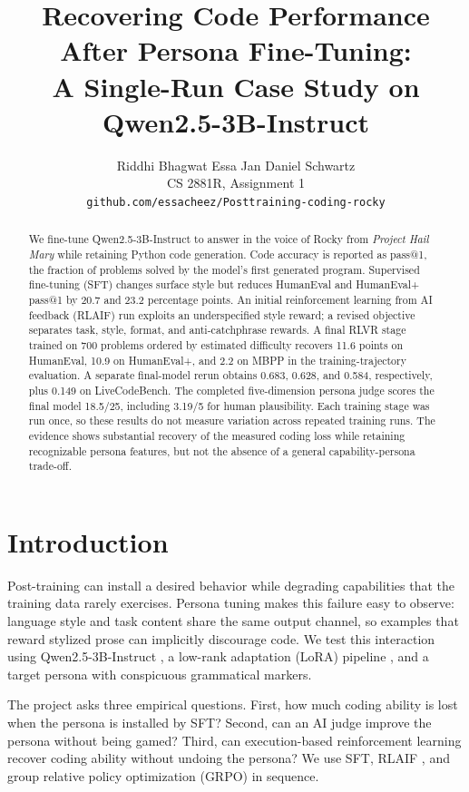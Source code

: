 \documentclass[10pt,twocolumn]{article}
\title{Recovering Code Performance After Persona Fine-Tuning:\\
A Single-Run Case Study on Qwen2.5-3B-Instruct}
\author{Riddhi Bhagwat \qquad Essa Jan \qquad Daniel Schwartz\\[0.4em]
\normalsize CS 2881R, Assignment 1\\
\normalsize\texttt{github.com/essacheez/Posttraining-coding-rocky}}
\date{}
\makeatletter
\newcommand{\he}{HumanEval}
\newcommand{\hep}{HumanEval+}
\newcommand{\mbpp}{MBPP}
\newcommand{\pass}{pass@1}
\makeatother
\begin{document}
\maketitle

\begin{abstract}
We fine-tune Qwen2.5-3B-Instruct to answer in the voice of Rocky from \emph{Project
Hail Mary} while retaining Python code generation. Code accuracy is reported as
\pass{}, the fraction of problems solved by the model's first generated program.
Supervised fine-tuning (SFT) changes surface style but reduces \he{} and \hep{}
\pass{} by 20.7 and 23.2 percentage points. An initial reinforcement learning from AI
feedback (RLAIF) run exploits an underspecified style reward; a revised objective
separates task, style, format, and anti-catchphrase rewards. A final RLVR stage trained
on 700 problems ordered by estimated difficulty recovers 11.6 points on \he{}, 10.9 on
\hep{}, and 2.2 on \mbpp{} in the training-trajectory evaluation. A separate final-model
rerun obtains 0.683, 0.628, and 0.584, respectively, plus 0.149 on LiveCodeBench. The
completed five-dimension persona judge scores the final model 18.5/25, including 3.19/5
for human plausibility. Each training stage was run once, so these results do not measure
variation across repeated training runs. The evidence shows substantial recovery of the
measured coding loss while retaining recognizable persona features, but not the absence
of a general capability-persona trade-off.
\end{abstract}

\section{Introduction}

Post-training can install a desired behavior while degrading capabilities that the
training data rarely exercises. Persona tuning makes this failure easy to observe:
language style and task content share the same output channel, so examples that reward
stylized prose can implicitly discourage code. We test this interaction using
Qwen2.5-3B-Instruct \cite{qwen25}, a low-rank adaptation (LoRA) pipeline
\cite{hu2021lora}, and a target persona with conspicuous grammatical markers.

The project asks three empirical questions. First, how much coding ability is lost when
the persona is installed by SFT? Second, can an AI judge improve the persona without
being gamed? Third, can execution-based reinforcement learning recover coding ability
without undoing the persona? We use SFT, RLAIF \cite{lee2023rlaif},
and group relative policy optimization (GRPO) \cite{shao2024deepseekmath} in sequence.
\end{document}
